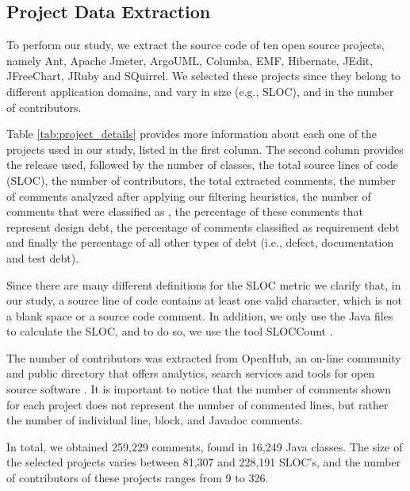\subsection{Project Data Extraction} %
\label{sub:data_extraction}

To perform our study, we extract the source code of ten open source projects, namely Ant, Apache Jmeter, ArgoUML, Columba, EMF, Hibernate, JEdit, JFreeChart, JRuby and SQuirrel. We selected these projects since they belong to different application domains, and vary in size (e.g., SLOC), and in the number of contributors. 

Table \ref{tab:project_details} provides more information about each one of the projects used in our study, listed in the first column. The second column provides the release used, followed by the number of classes, the total source lines of code (SLOC), the number of contributors, the total extracted comments, the number of comments analyzed after applying our filtering heuristics, the number of comments that were classified as \SATD, the percentage of these comments that represent design debt, the percentage of \SATD comments classified as requirement debt and finally the percentage of all other types of debt (i.e., defect, documentation and test debt). 

Since there are many different definitions for the SLOC metric we clarify that, in our study, a source line of code contains at least one valid character, which is not a blank space or a source code comment. In addition, we only use the Java files to calculate the SLOC, and to do so, we use the tool SLOCCount \cite{wheeler2004:home}. 

The number of contributors was extracted from OpenHub, an on-line community and public directory that offers analytics, search services and tools for open source software \cite{Openhub:home}. It is important to notice that the number of comments shown for each project does not represent the number of commented lines, but rather the number of individual line, block, and Javadoc comments. 

In total, we obtained 259,229 comments, found in 16,249 Java classes. The size of the selected projects varies between 81,307 and 228,191 SLOC's, and the number of contributors of these projects ranges from 9 to 326. 

